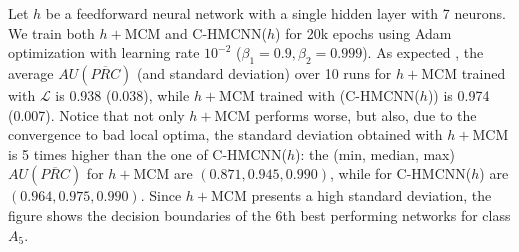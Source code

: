 \documentclass{article}
\newcommand{\module}{\text{MCM}}
\newcommand{\loss}{\text{MCLoss}}
\newcommand{\system}[1]{C-HMCNN(#1)}
\newcommand{\auprc}{$AU(\overline{PRC}) $}
\begin{document}
Let $h$ be a feedforward neural network with a single hidden layer with 7 neurons.  We train both $h+\module$ and \system{$h$} for 20k epochs using Adam optimization with learning rate $10^{-2}$ ($\beta_1= 0.9, \beta_2= 0.999$). 
As expected , the average {\auprc} (and standard deviation) over 10 runs for $h+\module$ trained with $\mathcal{L}$ is 0.938 (0.038), while $h+\module$ trained with {\loss} (\system{$h$}) is 0.974 (0.007). Notice that not only $h+\module$ performs worse, but also, due to the convergence to bad local optima, the standard deviation obtained with $h+\module$ is 5 times higher than the one of \system{$h$}: the (min, median, max) {\auprc} for $h+\module$ are $(0.871, 0.945,
0.990)$, while for \system{$h$} are $(0.964, 0.975, 0.990)$.
Since $h+\module$ presents a high standard deviation, the figure shows the decision boundaries of the 6th best performing networks for class $A_5$. 
\end{document}

